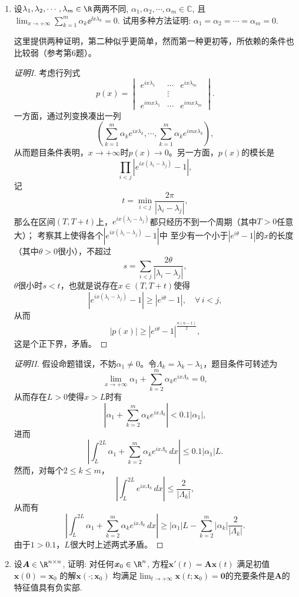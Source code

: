 \begin{quizb}
\begin{enumerate}
\item 设\(\lambda_1,\lambda_2,\cdots,\lambda_m\in\R\)两两不同, 
\(\alpha_1,\alpha_2,\cdots,\alpha_m\in\mathbb{C}\), 
且\(\lim_{x\rightarrow+\infty}\sum_{k=1}^{m}\alpha_k\ee^{\ii x\lambda_k}=0.\) 
试用多种方法证明: \(\alpha_1=\alpha_2=\cdots=\alpha_m=0\).

这里提供两种证明，第二种似乎更简单，然而第一种更初等，所依赖的条件也比较弱（参考第6题）。
\begin{proof}[证明I]
考虑行列式
\[p(x)=\begin{vmatrix}e^{ix\lambda_1}&\cdots&e^{ix\lambda_m}\\
&\vdots&\\e^{imx\lambda_1}&\cdots&e^{imx\lambda_m}
\end{vmatrix}.\]
一方面，通过列变换凑出一列
\[\left(\sum_{k=1}^m\alpha_ke^{ix\lambda_k},\cdots,\sum_{k=1}^m\alpha_ke^{imx\lambda_k}\right),\]
从而题目条件表明，$x\to+\infty$时$p(x)\to0$。另一方面，$p(x)$的模长是
\[\prod_{i<j}|e^{ix(\lambda_i-\lambda_j)}-1|,\]
记\[t=\min_{i<j}\frac{2\pi}{|\lambda_i-\lambda_j|},\]
那么在区间$(T,T+t)$上，$e^{ix(\lambda_i-\lambda_j)}$都只经历不到一个周期（其中$T>0$任意大）；
考察其上使得各个$|e^{ix(\lambda_i-\lambda_j)}-1|$中
至少有一个小于$|e^{i\theta}-1|$的$x$的长度（其中$\theta>0$很小），不超过
\[s=\sum_{i<j}\frac{2\theta}{|\lambda_i-\lambda_j|},\]
$\theta$很小时$s<t$，也就是说存在$x\in(T,T+t)$使得
\[|e^{ix(\lambda_i-\lambda_j)}-1|\geqslant|e^{i\theta}-1|,\quad\forall\,i<j,\]
从而\[|p(x)|\geqslant|e^{i\theta}-1|^{\frac{n(n-1)}{2}},\]
这是个正下界，矛盾。
\end{proof}
\begin{proof}[证明II]
假设命题错误，不妨$\alpha_1\ne0$。令$\Lambda_k=\lambda_k-\lambda_1$，题目条件可转述为
\[\lim_{x\to+\infty}\alpha_1+\sum_{k=2}^m\alpha_ke^{ix\Lambda_k}=0,\]
从而存在$L>0$使得$x>L$时有
\[\left|\alpha_1+\sum_{k=2}^m\alpha_ke^{ix\Lambda_k}\right|<0.1|\alpha_1|,\]
进而\[\left|\int_L^{2L}\alpha_1+\sum_{k=2}^m\alpha_ke^{ix\Lambda_k}\,dx\right|\leqslant0.1|\alpha_1|L.\]
然而，对每个$2 \leqslant k \leqslant m$，
\[\left|\int_L^{2L}e^{ix\Lambda_k}\,dx\right|\leqslant\frac{2}{|\Lambda_k|},\]
从而有
\[\left|\int_L^{2L}\alpha_1+\sum_{k=2}^m\alpha_ke^{ix\Lambda_k}\,dx\right|
\geqslant|\alpha_1|L-\sum_{k=2}^m|\alpha_k|\frac{2}{|\Lambda_k|}.\]
由于$1>0.1$，$L$很大时上述两式矛盾。
\end{proof}

\item 设\(\boldsymbol{A}\in\R^{n\times n}\), 
证明: 对任何\(\boldsymbol{x}_0\in\R^n\), 
方程\(\boldsymbol{x}'(t)=\boldsymbol{Ax}(t)\)
满足初值\(\boldsymbol{x}(0)=\boldsymbol{x}_0\)
的解\(\boldsymbol{x}(\cdot;\boldsymbol{x}_0)\)
均满足\(\lim_{t\rightarrow+\infty}\boldsymbol{x}(t;\boldsymbol{x}_0)
=\boldsymbol{0}\)的充要条件是\(\boldsymbol{A}\)的特征值具有负实部.


\end{enumerate}
\end{quizb}
